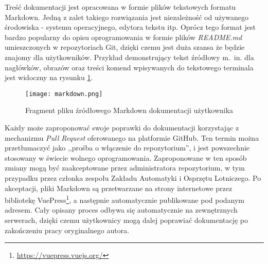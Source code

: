 Treść dokumentacji jest opracowana w formie plików tekstowych formatu Markdown. Jedną z zalet takiego rozwiązania jest niezależność od używanego środowiska - systemu operacyjnego, edytora tekstu itp. Oprócz tego format jest bardzo popularny do opisu oprogramowania w formie plików \emph{README.md} umieszczonych w repozytoriach Git, dzięki czemu jest duża szansa że będzie znajomy dla użytkowników. Przykład demonstrujący tekst źródłowy m.~in. dla nagłówków, obrazów oraz treści komend wpisywanych do tekstowego terminala jest widoczny na rysunku \ref{fig:markdown}.

\begin{figure}[!h]
    \caption{Fragment pliku źródłowego Markdown dokumentacji użytkownika}
    \label{fig:markdown}
    \centering \texttt{[image: markdown.png]}
\end{figure}

Każdy może zaproponować swoje poprawki do dokumentacji korzystając z mechanizmu \emph{Pull Request} oferowanego na platformie GitHub. Ten termin można przetłumaczyć jako ,,prośba o włączenie do repozytorium'', i jest powszechnie stosowany w świecie wolnego oprogramowania. Zaproponowane w ten sposób zmiany mogą być zaakceptowane przez administratora repozytorium, w tym przypadku przez członka zespołu Zakładu Automatyki i Osprzętu Lotniczego. Po akceptacji, pliki Markdown są przetwarzane na strony internetowe przez bibliotekę VuePress\footnote{\url{https://vuepress.vuejs.org/}}, a następnie automatycznie publikowane pod podanym adresem. Cały opisany proces odbywa się automatycznie na zewnętrznych serwerach, dzięki czemu użytkownicy mogą dalej poprawiać dokumentację po zakończeniu pracy oryginalnego autora.
